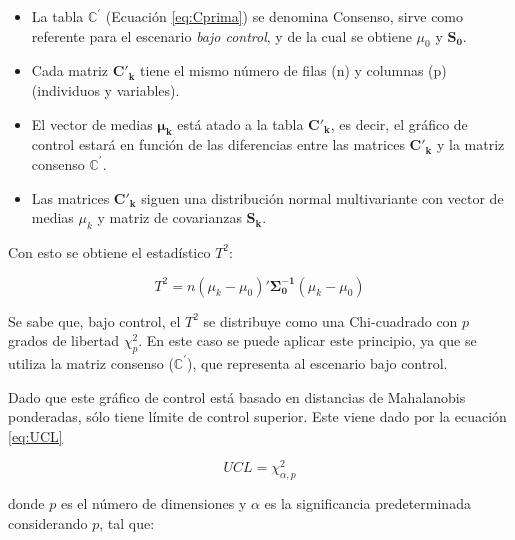 \documentclass[water,article,submit,moreauthors,pdftex]{mdpi}
\providecommand{\tightlist}{%
  \setlength{\itemsep}{0pt}\setlength{\parskip}{4pt}}
\begin{document}
\begin{itemize}
\tightlist
\item
  La tabla \(\mathbb{C}^{'}\) (Ecuación \ref{eq:Cprima}) se denomina
  Consenso, sirve como referente para el escenario \emph{bajo control},
  y de la cual se obtiene \(\mu_{0}\) y \(\mathbf{S_0}\).\\
\item
  Cada matriz \(\mathbf{C'_k}\) tiene el mismo número de filas (n) y
  columnas (p) (individuos y variables).
\item
  El vector de medias \(\mathbf{\mu_k}\) está atado a la tabla
  \(\mathbf{C'_k}\), es decir, el gráfico de control estará en función
  de las diferencias entre las matrices \(\mathbf{C'_k}\) y la matriz
  consenso \(\mathbf{\mathbb{C^{'}}}\).
\item
  Las matrices \(\mathbf{C'_k}\) siguen una distribución normal
  multivariante con vector de medias \(\mu_{k}\) y matriz de covarianzas
  \(\mathbf{S_k}\).
\end{itemize}

Con esto se obtiene el estadístico \(T^2\):

\begin{equation}
T^2=n (\mu_{k}-\mu_{0})'\mathbf{\Sigma_{0}^{-1}}(\mu_{k}-\mu_{0})
\label{eq:T2}
\end{equation}

Se sabe que, bajo control, el \(T^2\) se distribuye como una
Chi-cuadrado con \(p\) grados de libertad \(\chi^2_p\). En este caso se
puede aplicar este principio, ya que se utiliza la matriz consenso
(\(\mathbb{C}^{'}\)), que representa al escenario bajo control.

Dado que este gráfico de control está basado en distancias de
Mahalanobis ponderadas, sólo tiene límite de control superior. Este
viene dado por la ecuación \ref{eq:UCL}

\begin{equation}
UCL=\chi^2_{\alpha,p}
\label{eq:UCL}
\end{equation}

donde \(p\) es el número de dimensiones y \(\alpha\) es la significancia
predeterminada considerando \(p\), tal que:
\end{document}
